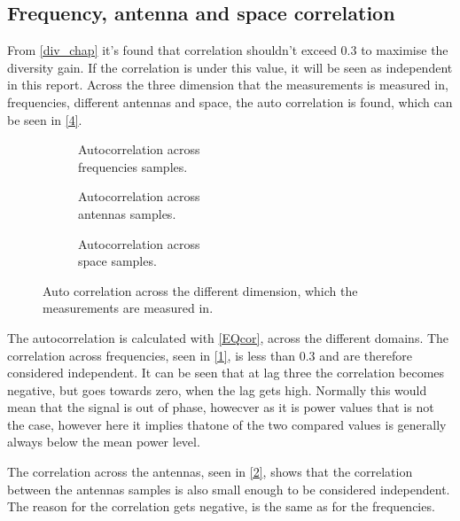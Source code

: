 \subsection{Frequency, antenna and space correlation}
From \autoref{div_chap} it's found that correlation shouldn't exceed 0.3 to maximise the diversity gain. If the correlation is under this value, it will be seen as independent in this report. Across the three dimension that the measurements is measured in, frequencies, different antennas and space, the auto correlation is found, which can be seen in \autoref{4}.

\begin{figure}[H]
\captionsetup{belowskip=0em}
\centering
\begin{subfigure}[b]{0.326\textwidth}

\caption{Autocorrelation across \\ frequencies samples.}
\label{1}
\end{subfigure}
\begin{subfigure}[b]{0.326\textwidth}

\caption{Autocorrelation across \\antennas samples.}
\label{2}
\end{subfigure}
\begin{subfigure}[b]{0.326\textwidth}

\caption{Autocorrelation across \\space samples.}
\label{3}
\end{subfigure}
\captionsetup{belowskip=-1.5em}
\caption{Auto correlation across the different dimension, which the measurements are measured in.}
\label{4}
\end{figure}

The autocorrelation is calculated with \autoref{EQcor}, across the different domains. The correlation across frequencies, seen in \autoref{1}, is less than 0.3 and are therefore considered independent. It can be seen that at lag three the correlation becomes negative, but goes towards zero, when the lag gets high. Normally this would mean that the signal is out of phase, howecver as it is power values that is not the case, however here it implies thatone of the two compared values is generally always below the mean power level. 

The correlation across the antennas, seen in \autoref{2}, shows that the correlation between the antennas samples is also small enough to be considered independent. The reason for the correlation gets negative, is the same as for the frequencies.

